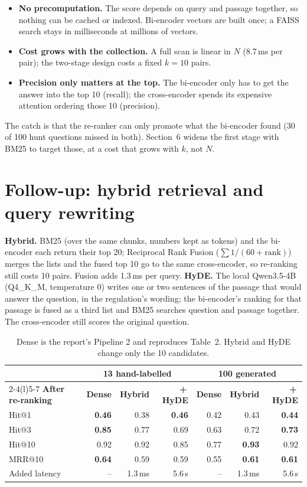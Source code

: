 \documentclass[10pt,a4paper]{article}
\begin{document}
\begin{itemize}
  \item \textbf{No precomputation.} The score depends on query and passage together, so nothing can be cached or
    indexed. Bi-encoder vectors are built once; a FAISS search stays in milliseconds at millions of vectors.
  \item \textbf{Cost grows with the collection.} A full scan is linear in $N$ (8.7\,ms per pair); the two-stage
    design costs a fixed $k = 10$ pairs.
  \item \textbf{Precision only matters at the top.} The bi-encoder only has to get the answer into the top 10
    (recall); the cross-encoder spends its expensive attention ordering those 10 (precision).
\end{itemize}

The catch is that the re-ranker can only promote what the bi-encoder found (30 of 100 hunt questions missed in
both). Section~6 widens the first stage with BM25 to target those, at a cost that grows with $k$, not $N$.

\section{Follow-up: hybrid retrieval and query rewriting}

\textbf{Hybrid.} BM25 (over the same chunks, numbers kept as tokens) and the bi-encoder each return their top 20;
Reciprocal Rank Fusion ($\sum 1/(60 + \mathrm{rank})$) merges the lists and the fused top 10 go to the same
cross-encoder, so re-ranking still costs 10 pairs. Fusion adds 1.3\,ms per query.
\textbf{HyDE.} The local Qwen3.5-4B (Q4\_K\_M, temperature 0) writes one or two sentences of the passage that
would answer the question, in the regulation's wording; the bi-encoder's ranking for that passage is fused as a
third list and BM25 searches question and passage together. The cross-encoder still scores the original question.

\begin{table}[!htbp]
\centering\small
\begin{tabular}{@{}lrrrrrr@{}}
\toprule
 & \multicolumn{3}{c}{\textbf{13 hand-labelled}} & \multicolumn{3}{c}{\textbf{100 generated}} \\
\cmidrule(lr){2-4}\cmidrule(l){5-7}
\textbf{After re-ranking} & \textbf{Dense} & \textbf{Hybrid} & \textbf{+\,HyDE} & \textbf{Dense} & \textbf{Hybrid} & \textbf{+\,HyDE} \\
\midrule
Hit@1   & \textbf{0.46} & 0.38 & \textbf{0.46} & 0.42 & 0.43 & \textbf{0.44} \\
Hit@3   & \textbf{0.85} & 0.77 & 0.69 & 0.63 & 0.72 & \textbf{0.73} \\
Hit@10  & 0.92 & 0.92 & 0.85 & 0.77 & \textbf{0.93} & 0.92 \\
MRR@10  & \textbf{0.64} & 0.59 & 0.59 & 0.55 & \textbf{0.61} & \textbf{0.61} \\
Added latency & -- & 1.3\,ms & 5.6\,s & -- & 1.3\,ms & 5.6\,s \\
\bottomrule
\end{tabular}
\caption{Dense is the report's Pipeline 2 and reproduces Table~2. Hybrid and HyDE change only the 10 candidates.}
\end{table}
\end{document}
